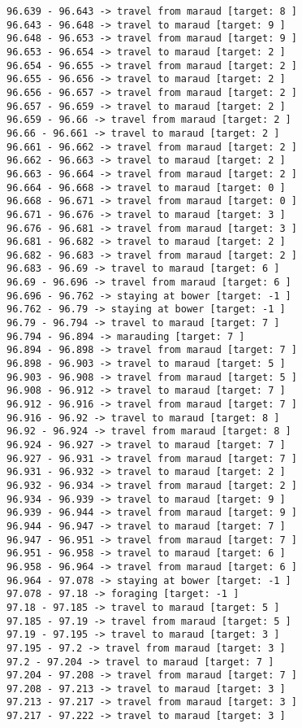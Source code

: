 \documentclass[11pt]{article}
\begin{document}
\begin{Verbatim}[commandchars=\\\{\}]
96.639 - 96.643 -> travel from maraud [target: 8 ]
96.643 - 96.648 -> travel to maraud [target: 9 ]
96.648 - 96.653 -> travel from maraud [target: 9 ]
96.653 - 96.654 -> travel to maraud [target: 2 ]
96.654 - 96.655 -> travel from maraud [target: 2 ]
96.655 - 96.656 -> travel to maraud [target: 2 ]
96.656 - 96.657 -> travel from maraud [target: 2 ]
96.657 - 96.659 -> travel to maraud [target: 2 ]
96.659 - 96.66 -> travel from maraud [target: 2 ]
96.66 - 96.661 -> travel to maraud [target: 2 ]
96.661 - 96.662 -> travel from maraud [target: 2 ]
96.662 - 96.663 -> travel to maraud [target: 2 ]
96.663 - 96.664 -> travel from maraud [target: 2 ]
96.664 - 96.668 -> travel to maraud [target: 0 ]
96.668 - 96.671 -> travel from maraud [target: 0 ]
96.671 - 96.676 -> travel to maraud [target: 3 ]
96.676 - 96.681 -> travel from maraud [target: 3 ]
96.681 - 96.682 -> travel to maraud [target: 2 ]
96.682 - 96.683 -> travel from maraud [target: 2 ]
96.683 - 96.69 -> travel to maraud [target: 6 ]
96.69 - 96.696 -> travel from maraud [target: 6 ]
96.696 - 96.762 -> staying at bower [target: -1 ]
96.762 - 96.79 -> staying at bower [target: -1 ]
96.79 - 96.794 -> travel to maraud [target: 7 ]
96.794 - 96.894 -> marauding [target: 7 ]
96.894 - 96.898 -> travel from maraud [target: 7 ]
96.898 - 96.903 -> travel to maraud [target: 5 ]
96.903 - 96.908 -> travel from maraud [target: 5 ]
96.908 - 96.912 -> travel to maraud [target: 7 ]
96.912 - 96.916 -> travel from maraud [target: 7 ]
96.916 - 96.92 -> travel to maraud [target: 8 ]
96.92 - 96.924 -> travel from maraud [target: 8 ]
96.924 - 96.927 -> travel to maraud [target: 7 ]
96.927 - 96.931 -> travel from maraud [target: 7 ]
96.931 - 96.932 -> travel to maraud [target: 2 ]
96.932 - 96.934 -> travel from maraud [target: 2 ]
96.934 - 96.939 -> travel to maraud [target: 9 ]
96.939 - 96.944 -> travel from maraud [target: 9 ]
96.944 - 96.947 -> travel to maraud [target: 7 ]
96.947 - 96.951 -> travel from maraud [target: 7 ]
96.951 - 96.958 -> travel to maraud [target: 6 ]
96.958 - 96.964 -> travel from maraud [target: 6 ]
96.964 - 97.078 -> staying at bower [target: -1 ]
97.078 - 97.18 -> foraging [target: -1 ]
97.18 - 97.185 -> travel to maraud [target: 5 ]
97.185 - 97.19 -> travel from maraud [target: 5 ]
97.19 - 97.195 -> travel to maraud [target: 3 ]
97.195 - 97.2 -> travel from maraud [target: 3 ]
97.2 - 97.204 -> travel to maraud [target: 7 ]
97.204 - 97.208 -> travel from maraud [target: 7 ]
97.208 - 97.213 -> travel to maraud [target: 3 ]
97.213 - 97.217 -> travel from maraud [target: 3 ]
97.217 - 97.222 -> travel to maraud [target: 3 ]

\end{Verbatim}
\end{document}

